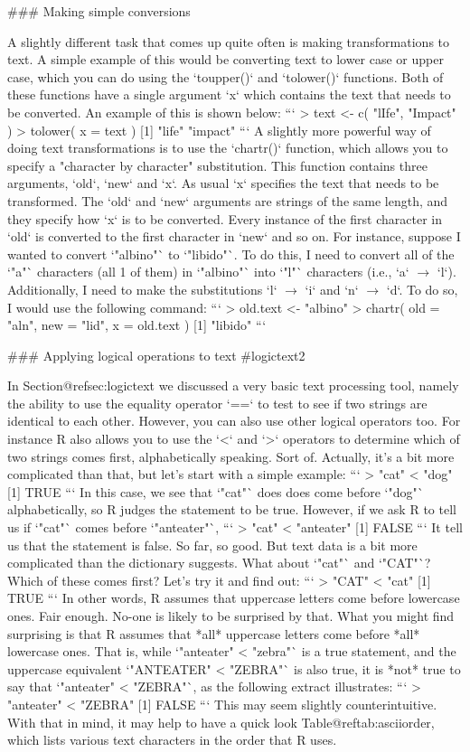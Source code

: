 ### Making simple conversions

A slightly different task that comes up quite often is making transformations to text. A simple example of this would be converting text to lower case or upper case, which you can do using the `toupper()` and `tolower()` functions. Both of these functions have a single argument `x` which contains the text that needs to be converted. An example of this is shown below:
```
> text <- c( "lIfe", "Impact" )
> tolower( x = text )
[1] "life"   "impact"
```
A slightly more powerful way of doing text transformations is to use the `chartr()` function, which allows you to specify a "character by character" substitution. This function contains three arguments, `old`, `new` and `x`. As usual `x` specifies the text that needs to be transformed. The `old` and `new` arguments are strings of the same length, and they specify how `x` is to be converted. Every instance of the first character in `old` is converted to the first character in `new` and so on. For instance, suppose I wanted to convert `"albino"` to `"libido"`. To do this, I need to convert all of the `"a"` characters (all 1 of them) in `"albino"` into `"l"` characters (i.e., `a` $\rightarrow$ `l`). Additionally, I need to make the substitutions `l` $\rightarrow$ `i` and `n` $\rightarrow$ `d`. To do so, I would use the following command:
```
> old.text <- "albino"
> chartr( old = "aln", new = "lid", x = old.text )
[1] "libido"
``` 

### Applying logical operations to text {#logictext2}

In Section@refsec:logictext we discussed a very basic text processing tool, namely the ability to use the equality operator `==` to test to see if two strings are identical to each other. However, you can also use other logical operators too. For instance R also allows you to use the `<` and `>` operators to determine which of two strings comes first, alphabetically speaking. Sort of. Actually, it's a bit more complicated than that, but let's start with a simple example:
```
> "cat" < "dog"
[1] TRUE
```
In this case, we see that `"cat"` does does come before `"dog"` alphabetically, so R judges the statement to be true. However, if we ask R to tell us if `"cat"` comes before `"anteater"`, 
```
> "cat" < "anteater"
[1] FALSE
``` 
It tell us that the statement is false. So far, so good. But text data is a bit more complicated than the dictionary suggests. What about `"cat"` and `"CAT"`? Which of these comes first? Let's try it and find out:
```
> "CAT" < "cat"
[1] TRUE
```
In other words, R assumes that uppercase letters come before lowercase ones. Fair enough. No-one is likely to be surprised by that. What you might find surprising is that R assumes that *all* uppercase letters come before *all* lowercase ones. That is, while `"anteater" < "zebra"` is a true statement, and the uppercase equivalent `"ANTEATER" < "ZEBRA"` is also true, it is *not* true to say that `"anteater" < "ZEBRA"`, as the following extract illustrates:
```
> "anteater" < "ZEBRA"
[1] FALSE
```
This may seem slightly counterintuitive. With that in mind, it may help to have a quick look Table@reftab:asciiorder, which lists various text characters in the order that R uses. 

